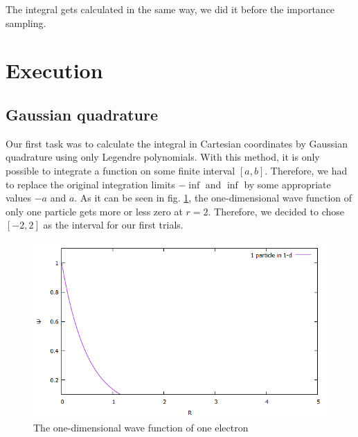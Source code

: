 \documentclass[10pt,a4paper]{article}
\begin{document}
The integral gets calculated in the same way, we did it before the importance sampling.

\section{Execution}

\subsection{Gaussian quadrature}
Our first task was to calculate the integral in Cartesian coordinates by Gaussian quadrature using only Legendre polynomials. With this method, it is only possible to integrate a function on some finite interval $[a,b]$. Therefore, we had to replace the original integration limits $-\inf$ and $\inf$ by some appropriate values $-a$ and $a$. As it can be seen in fig. \ref{oneparticle}, the one-dimensional wave function of only one particle gets more or less zero at $r=2$. Therefore, we decided to chose $[-2,2]$ as the interval for our first trials.
\begin{figure}[h]
	\includegraphics[width=\textwidth]{Psi.png}
	\caption{The one-dimensional wave function of one electron \label{oneparticle}}
\end{figure}
\end{document}
